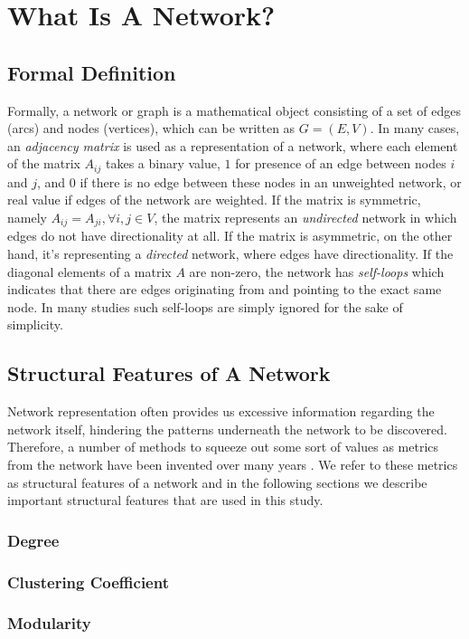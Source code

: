 \documentclass{article}
\begin{document}
\section{What Is A Network?}
	\subsection{Formal Definition}
	Formally, a network or graph is a mathematical object consisting of a set of edges (arcs) and nodes (vertices), which can be written as $G = (E,V)$. In many cases, an \textit{adjacency matrix} is used as a representation of a network, where each element of the matrix $A_{ij}$ takes a binary value, $1$ for presence of an edge between nodes $i$ and $j$, and $0$ if there is no edge between these nodes in an unweighted network, or real value if edges of the network are weighted. If the matrix is symmetric, namely $A_{ij} = A_{ji},  \forall i,j \in V$, the matrix represents an \textit{undirected} network in which edges do not have directionality at all. If the matrix is asymmetric, on the other hand, it's representing a \textit{directed} network, where edges have directionality. If the diagonal elements of a matrix $A$ are non-zero, the network has \textit{self-loops} which indicates that there are edges originating from and pointing to the exact same node. In many studies such self-loops are simply ignored for the sake of simplicity.
	
	\subsection{Structural Features of A Network}
	Network representation often provides us excessive information regarding the network itself, hindering the patterns underneath the network to be discovered. Therefore, a number of methods to squeeze out some sort of values as metrics from the network have been invented over many years \cite{NetworkCharacterizationSurvey}. We refer to these metrics as structural features of a network and in the following sections we describe important structural features that are used in this study.
		
	
	\subsubsection{Degree}
	\subsubsection{Clustering Coefficient}
	\subsubsection{Modularity}
\end{document}
